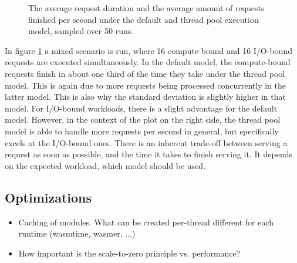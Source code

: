 \begin{figure}
    \begin{center}
        
    \end{center}
    \caption{The average request duration and the average amount of requests finished per second under the default and thread pool execution model, sampled over 50 runs.}
    \label{fig:default_vs_thread_pool_mixed}
\end{figure}

In figure \ref{fig:default_vs_thread_pool_mixed} a mixed scenario is run, where 16 compute-bound and 16 I/O-bound requests are executed simultaneously. In the default model, the compute-bound requests finish in about one third of the time they take under the thread pool model. This is again due to more requests being processed concurrently in the latter model. This is also why the standard deviation is slightly higher in that model. For I/O-bound workloads, there is a slight advantage for the default model. However, in the context of the plot on the right side, the thread pool model is able to handle more requests per second in general, but specifically excels at the I/O-bound ones. There is an inherent trade-off between serving a request as soon as possible, and the time it takes to finish serving it. It depends on the expected workload, which model should be used.


\subsection{Optimizations}

\begin{itemize}
    \item Caching of modules. What can be created per-thread different for each runtime (wasmtime, wasmer, ...)
    \item How important is the scale-to-zero principle vs. performance?
\end{itemize}